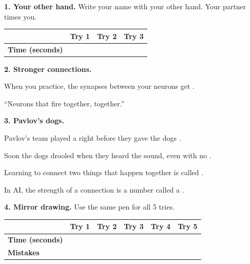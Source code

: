 \documentclass[11pt]{article}
\begin{document}
\partner


\vspace{0.4em}
{\large\textbf{1. Your other hand.}} Write your name with your other hand. Your partner times you.

\vspace{0.3em}
\begin{tabular}{|R{1.3in}|c|c|c|}
\hline
 & \textbf{Try 1} & \textbf{Try 2} & \textbf{Try 3} \\ \hline
\textbf{Time (seconds)} & \hspace{0.2in} & \hspace{1.1in} & \hspace{1.1in} \\ \hline
\end{tabular}

\vspace{1.0em}
{\large\textbf{2. Stronger connections.}}

\vspace{0.4em}
When you practice, the synapses between your neurons get .

\vspace{0.8em}
``Neurons that fire together,  together.''

\vspace{1.0em}
{\large\textbf{3. Pavlov's dogs.}}

\vspace{0.4em}
Pavlov's team played a  right before they gave the dogs .

\vspace{0.8em}
Soon the dogs drooled when they heard the sound, even with no .

\vspace{0.8em}
Learning to connect two things that happen together is called .

\vspace{0.8em}
In AI, the strength of a connection is a number called a .

\vspace{1.1em}
{\large\textbf{4. Mirror drawing.}} Use the same pen for all 5 tries.

\vspace{0.3em}
\begin{tabular}{|R{1.3in}|c|c|c|c|c|}
\hline
 & \textbf{Try 1} & \textbf{Try 2} & \textbf{Try 3} & \textbf{Try 4} & \textbf{Try 5} \\ \hline
\textbf{Time (seconds)} &  & \hspace{0.75in} & \hspace{0.75in} & \hspace{0.75in} & \hspace{0.75in} \\ \hline
\textbf{Mistakes} & & & & & \\ \hline
\end{tabular}
\end{document}
